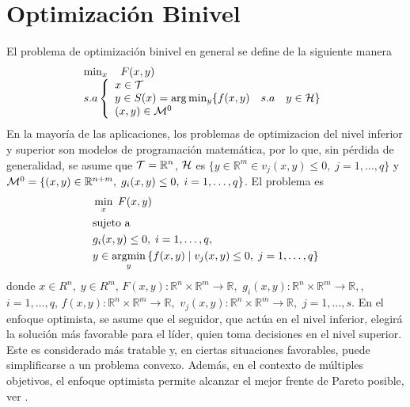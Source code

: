 \section{Optimización Binivel }
El problema de optimización binivel en general se define de la siguiente manera
\begin{equation} \label{eq:Def1Binivel}
    \begin{array}{l}
       \min_{x} \quad F(x, y)\\
        s.a \left\{ \begin{array}{l}
            x \in \cal{T} \\
             y \in S(x) = \arg  \min_{y} \{ f(x, y) \quad s.a \quad y \in  \cal{H}\}\\
            (x,y) \in {\cal{M}}^0 
        \end{array}\right.
        \end{array} \end{equation}
En la mayor\'ia de las aplicaciones, los problemas de optimizacion del nivel inferior y superior son modelos de programaci\'on matem\'atica, por lo  que, sin p\'erdida de generalidad, se asume que  ${\cal{T}}=\mathbb{R}^n$,  $\cal{H}$ es  $\{y\in \mathbb{R}^m\in v_j(x, y)\leq 0,\;j=1,\ldots,q\}$  y
  ${\cal{M}}^0=\{(x,y)\in\mathbb{R}^{n+m},\;g_i(x, y)\leq 0,\;i=1,\ldots,q\}$. El problema es  
\begin{equation}
\begin{aligned}
& \min_{x} \; F(x, y) \\
& \text{sujeto a } \\
& g_i(x, y)\leq 0,\;i=1,\ldots,q, \\
& y \in \operatorname*{argmin}_{y} \left\{ f(x, y) \mid v_j(x, y)\leq 0,\;j=1,\ldots,q \right\}
\end{aligned}
\label{eq:ProblemaGeneral}
\end{equation}
donde 
$    x \in R^{n},\; y \in R^{m}$, $ F(x,y) : \mathbb{R}^{n} \times \mathbb{R}^{m} \to \mathbb{R},$ $ g_i(x,y)  : \mathbb{R}^{n} \times \mathbb{R}^{m} \to \mathbb{R} ,$, $i=1,\ldots, q$,  $f(x,y) : \mathbb{R}^{n} \times \mathbb{R}^{m} \to \mathbb{R},$  $v_j(x,y)  : \mathbb{R}^{n} \times \mathbb{R}^{m} \to \mathbb{R} ,$ $j=1,\ldots, s$.
En el enfoque optimista, se asume que el seguidor, que actúa en el nivel inferior, elegirá la solución más favorable para el líder, quien toma decisiones en el nivel superior. Este es considerado más tratable y, en ciertas situaciones favorables, puede simplificarse a un problema convexo. Además, en el contexto de múltiples objetivos, el enfoque optimista permite alcanzar el mejor frente de Pareto posible, ver \cite{DempeyZemkoho2020}.

